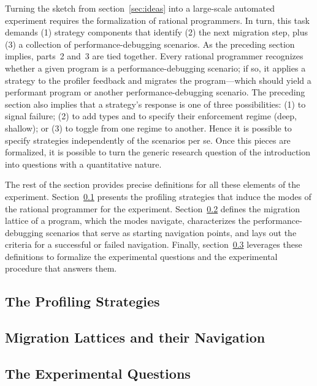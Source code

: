 
Turning the sketch from section~\ref{sec:ideas} into a large-scale automated
experiment requires the formalization of rational programmers. In turn, this
task demands (1) strategy components that identify (2) the next migration step,
plus (3) a collection of performance-debugging scenarios. As the preceding
section implies, parts~2 and~3 are tied together. Every rational programmer
recognizes whether a given program is a performance-debugging scenario; if so,
it applies a strategy to the profiler feedback and migrates the program---which
should yield a performant program or another performance-debugging scenario.
The preceding section also implies that a strategy's response is one of three
possibilities: (1) to signal failure; (2) to add types and to specify their
enforcement regime (deep, shallow); or (3) to toggle from one regime to
another. Hence it is possible to specify strategies independently of the
scenarios per se. Once this pieces are formalized, it is possible to turn the
generic research question of the introduction into questions with a quantitative
nature. 

The rest of the section provides precise definitions for all these elements of
the experiment.  Section~\ref{subsec:strategies} presents the profiling
strategies that induce the modes of the rational programmer for the experiment.
Section~\ref{subsec:lattice} defines the migration lattice of a program, which
the modes navigate, characterizes the performance-debugging scenarios that serve
as starting navigation points, and lays out the criteria for a successful or
failed navigation. Finally, section~\ref{subsec:questions} leverages these
definitions to formalize the experimental questions and the experimental
procedure that answers them.


\def\exp#1#2{\subsection{#2} \label{subsec:#1} }

\exp{strategies}{The Profiling Strategies}
\exp{lattice}{Migration Lattices and their Navigation}
\exp{questions}{The Experimental Questions}
